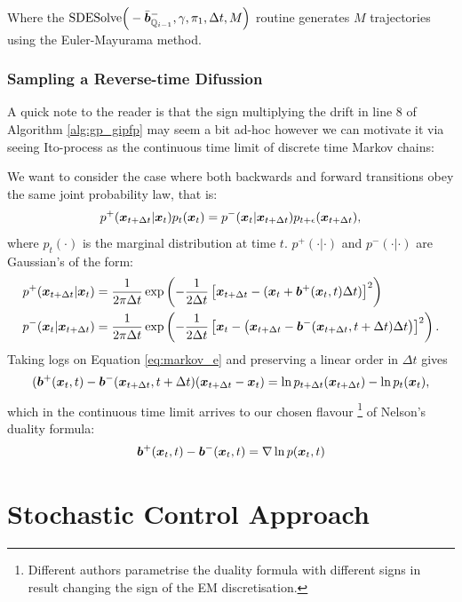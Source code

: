 \documentclass[a4paper,12pt,twoside,openright]{report}
\theoremstyle{definition}
\begin{document}
Where the $\text{SDESolve}\Big(-\bar{{\bm{b}}}^{-}_{{\mathbb{Q}}_{i-1}}, \gamma, \pi_1, \Delta t, M\Big)$ routine generates $M$ trajectories using the Euler-Mayurama method.

\subsubsection{Sampling a Reverse-time Difussion }
A quick note to the reader is that the sign multiplying the drift in line $8$ of Algorithm \ref{alg:gp_gipfp} may seem a bit ad-hoc however we can motivate it via seeing Ito-process as the continuous time limit of discrete time Markov chains:

We want to consider the case where both backwards and forward transitions  obey the same joint probability law, that is:
\begin{align}\label{eq:markov_e}
    p^{+}({\bm{x}}_{t+\Delta t}|{\bm{x}}_t)p_t({\bm{x}}_t)=p^{-}({\bm{x}}_t|{\bm{x}}_{t+\Delta t})p_{t+\epsilon}({\bm{x}}_{t+\Delta t}),
\end{align}
where $p_t(\cdot)$ is the marginal distribution at time $t$. $p^{+}(\cdot|\cdot)$ and $p^{-}(\cdot|\cdot)$ are Gaussian's of the form:
\begin{align*}
p^{+}({\bm{x}}_{t+\Delta t}|{\bm{x}}_t)&=\frac{1}{2\pi \Delta t }\exp\left(-\frac{1}{2\Delta t}\left[{\bm{x}}_{t+\Delta t}-({\bm{x}}_t+{\bm{b}}^{+}({\bm{x}}_t,t)\Delta t)\right]^2\right) \\
p^{-}({\bm{x}}_t|{\bm{x}}_{t+\Delta t})&=\frac{1}{2\pi \Delta t}\exp\left(-\frac{1}{2\Delta t}\left[{\bm{x}}_t-\left({\bm{x}}_{t+\Delta t}-{\bm{b}}^{-}({\bm{x}}_{t+\Delta t},t+\Delta t)\Delta t\right)\right]^2\right).
\end{align*}
Taking logs on Equation \ref{eq:markov_e} and preserving a linear order in $\Delta t$ gives
\begin{align*}
    ({\bm{b}}^+({\bm{x}}_t,t)-{\bm{b}}^-({\bm{x}}_{t+\Delta t},t+\Delta t)({\bm{x}}_{t+\Delta t}-{\bm{x}}_t)=\operatorname{ln} p_{t+\Delta t}({\bm{x}}_{t+\Delta t}) - \operatorname{ln} p_t({\bm{x}}_t), 
\end{align*}
which in the continuous time limit arrives to our chosen flavour \footnote{Different authors parametrise the duality formula with different signs in result changing the sign of the EM discretisation.} of Nelson's duality formula:
\begin{align*}
      {\bm{b}}^+({\bm{x}}_t,t) -{\bm{b}}^-({\bm{x}}_t,t) = \nabla\operatorname{ln} p({\bm{x}}_t, t)
\end{align*}

\section{Stochastic Control Approach}
\end{document}
